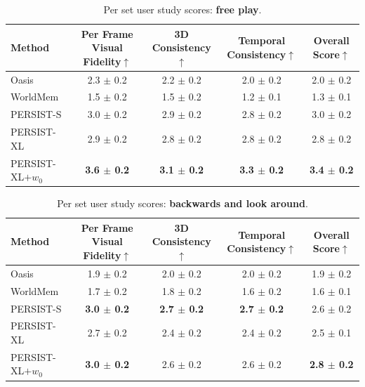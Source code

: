 \documentclass{article}
\theoremstyle{plain}
\theoremstyle{definition}
\theoremstyle{remark}
\begin{document}
\begin{table}[htb!]
\centering
\caption{Per set user study scores: \textbf{free play}.}
\label{tab:user_study_scores_free_play}
\begin{tabular}{lcccc}
\toprule
Method & Per Frame Visual Fidelity$\uparrow$ & 3D Consistency$\uparrow$ & Temporal Consistency$\uparrow$ & Overall Score$\uparrow$ \\
\midrule
Oasis & 2.3 $\pm$ 0.2 & 2.2 $\pm$ 0.2 & 2.0 $\pm$ 0.2 & 2.0 $\pm$ 0.2 \\
WorldMem & 1.5 $\pm$ 0.2 & 1.5 $\pm$ 0.2 & 1.2 $\pm$ 0.1 & 1.3 $\pm$ 0.1 \\
PERSIST-S & 3.0 $\pm$ 0.2 & 2.9 $\pm$ 0.2 & 2.8 $\pm$ 0.2 & 3.0 $\pm$ 0.2 \\
PERSIST-XL & 2.9 $\pm$ 0.2 & 2.8 $\pm$ 0.2 & 2.8 $\pm$ 0.2 & 2.8 $\pm$ 0.2 \\
PERSIST-XL$+w_0$ & \textbf{3.6 $\pm$ 0.2} & \textbf{3.1 $\pm$ 0.2} & \textbf{3.3 $\pm$ 0.2} & \textbf{3.4 $\pm$ 0.2} \\
\bottomrule
\end{tabular}
\end{table}

\begin{table}[htb!]
\centering
\caption{Per set user study scores: \textbf{backwards and look around}.}\label{tab:user_study_scores_backward_and_look_around}
\begin{tabular}{lcccc}
\toprule
Method & Per Frame Visual Fidelity$\uparrow$ & 3D Consistency$\uparrow$ & Temporal Consistency$\uparrow$ & Overall Score$\uparrow$ \\
\midrule
Oasis & 1.9 $\pm$ 0.2 & 2.0 $\pm$ 0.2 & 2.0 $\pm$ 0.2 & 1.9 $\pm$ 0.2 \\
WorldMem & 1.7 $\pm$ 0.2 & 1.8 $\pm$ 0.2 & 1.6 $\pm$ 0.2 & 1.6 $\pm$ 0.1 \\
PERSIST-S & \textbf{3.0 $\pm$ 0.2} & \textbf{2.7 $\pm$ 0.2} & \textbf{2.7 $\pm$ 0.2} & 2.6 $\pm$ 0.2 \\
PERSIST-XL & 2.7 $\pm$ 0.2 & 2.4 $\pm$ 0.2 & 2.4 $\pm$ 0.2 & 2.5 $\pm$ 0.1 \\
PERSIST-XL$+w_0$ & \textbf{3.0 $\pm$ 0.2} & 2.6 $\pm$ 0.2 & 2.6 $\pm$ 0.2 & \textbf{2.8 $\pm$ 0.2} \\
\bottomrule
\end{tabular}
\end{table}
\end{document}
